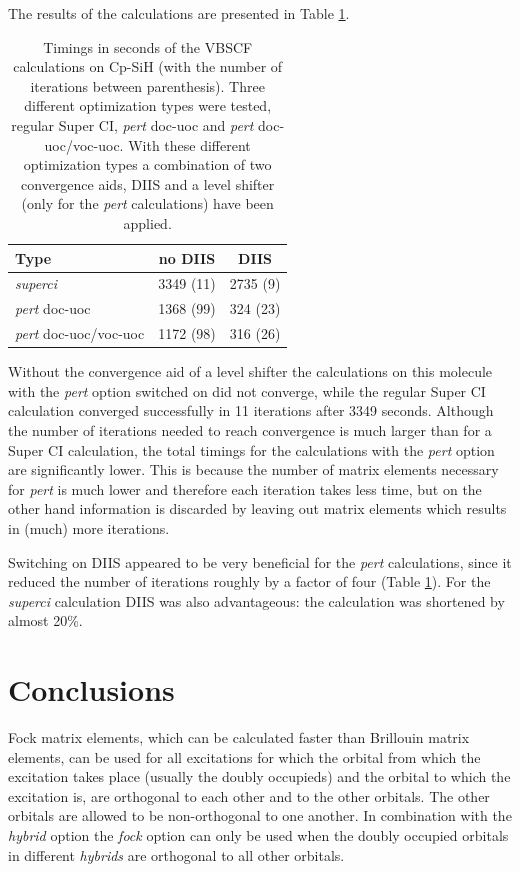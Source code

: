 The results of the calculations are presented in Table \ref{ch2.tab.budzelaar}.
\begin{table}[htdp]
\caption{Timings in seconds of the VBSCF calculations on Cp-SiH (with the number of iterations between parenthesis). Three different optimization types were tested, regular Super CI, \textit{pert} doc-uoc and \textit{pert} doc-uoc/voc-uoc. With these different optimization types a combination of two convergence aids, DIIS and a level shifter (only for the \textit{pert} calculations) have been applied.}
\begin{center}
\begin{tabular}{l c c}
\hline
Type & no DIIS & DIIS \\
\hline
\textit{superci} & 3349 (11) & 2735 (9) \\ 
\textit{pert} doc-uoc & 1368 (99) & 324 (23)\\ 
\textit{pert} doc-uoc/voc-uoc & 1172 (98) & 316 (26)\\
\end{tabular}
\label{ch2.tab.budzelaar}
\end{center}
\end{table}
Without the convergence aid of a level shifter the calculations on this molecule with the \textit{pert} option switched on did not converge, while the regular Super CI calculation converged successfully in 11 iterations after 3349 seconds. Although the number of iterations needed to reach convergence is much larger than for a Super CI calculation, the total timings for the calculations with the \textit{pert} option are significantly lower. This is because the number of matrix elements necessary for \textit{pert} is much lower and therefore each iteration takes less time, but on the other hand information is discarded by leaving out matrix elements which results in (much) more iterations. 

Switching on DIIS appeared to be very beneficial for the \textit{pert} calculations, since it reduced the number of iterations roughly by a factor of four (Table \ref{ch2.tab.budzelaar}). For the \textit{superci} calculation DIIS was also advantageous: the calculation was shortened by almost 20\%.

\section{Conclusions}

Fock matrix elements, which can be calculated faster than Brillouin matrix elements, can be used for all excitations for which the orbital from which the excitation takes place (usually the doubly occupieds) and the orbital to which the excitation is, are orthogonal to each other and to the other orbitals. The other orbitals are allowed to be non-orthogonal to one another. In combination with the \textit{hybrid} option the \textit{fock} option can only be used when the doubly occupied orbitals in different \textit{hybrids} are orthogonal to all other orbitals.

